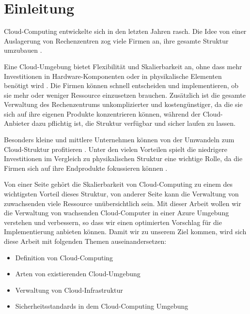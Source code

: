 \section{Einleitung}

Cloud-Computing entwickelte sich in den letzten Jahren rasch. Die Idee von einer Auslagerung von Rechenzentren zog viele Firmen an, ihre gesamte Struktur umzubauen \citep{Alalawi_CCR}. 

Eine Cloud-Umgebung bietet Flexibilität und Skalierbarkeit an, ohne dass mehr Investitionen in Hardware-Komponenten oder in physikalische Elementen benötigt wird \citep{Obrutsky_CSAD}. Die Firmen können schnell entscheiden und implementieren, ob sie mehr oder weniger Ressource einzusetzen brauchen. Zusätzlich ist die gesamte Verwaltung des Rechenzentrums unkomplizierter und kostengünstiger, da die sie sich auf ihre eigenen Produkte konzentrieren können, während der Cloud-Anbieter dazu pflichtig ist, die Struktur verfügbar und sicher laufen zu lassen.

Besonders kleine und mittlere Unternehmen können von der Umwandeln zum Cloud-Struktur profitieren \citep{Khalid_CCAI}. Unter den vielen Vorteilen spielt die niedrigere Investitionen im Vergleich zu physikalischen Struktur eine wichtige Rolle, da die Firmen sich auf ihre Endprodukte fokussieren können \citep{Donnery_CCSB}.

Von einer Seite gehört die Skalierbarkeit von Cloud-Computing zu einem des wichtigsten Vorteil dieses Struktur, von anderer Seite kann die Verwaltung von zuwachsenden viele Ressource unübersichtlich sein. Mit dieser Arbeit wollen wir die Verwaltung von wachsenden Cloud-Computer in einer Azure Umgebung verstehen und verbessern, so dass wir einen optimierten Vorschlag für die Implementierung anbieten können. Damit wir zu unserem Ziel kommen, wird sich diese Arbeit mit folgenden Themen auseinandersetzen:

\begin{itemize}
   \item Definition von Cloud-Computing
   \item Arten von existierenden Cloud-Umgebung
   \item Verwaltung von Cloud-Infrastruktur
   \item Sicherheitsstandards in dem Cloud-Computing Umgebung
\end{itemize}